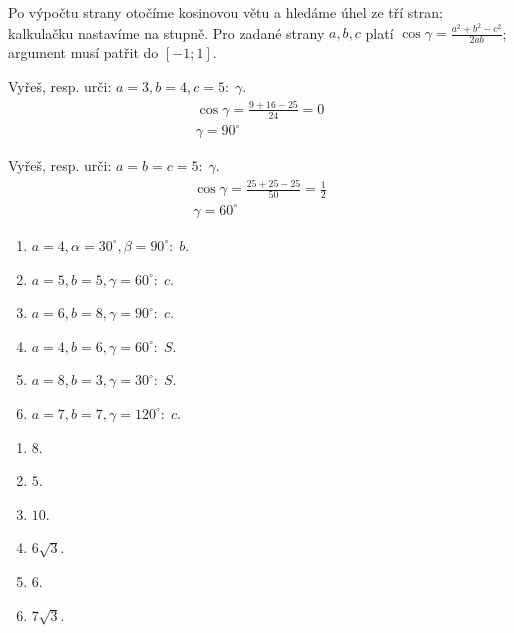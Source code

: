 \documentclass[11pt,a4paper]{article}
\begin{document}
Po výpočtu strany otočíme kosinovou větu a hledáme úhel ze tří stran; kalkulačku nastavíme na stupně.
Pro zadané strany $a,b,c$ platí $\cos\gamma=\frac{a^2+b^2-c^2}{2ab}$; argument musí patřit do $[-1;1]$.
\begin{prikladReseniBox}[title={Příklad 1}]
Vyřeš, resp. urči: $a=3,b=4,c=5:\;\gamma$.
\tcblower
\[\begin{aligned}\cos\gamma=\frac{9+16-25}{24}=0 \\ \gamma=90^\circ\end{aligned}\]
\end{prikladReseniBox}
\begin{prikladReseniBox}[title={Příklad 2}]
Vyřeš, resp. urči: $a=b=c=5:\;\gamma$.
\tcblower
\[\begin{aligned}\cos\gamma=\frac{25+25-25}{50}=\frac{1}{2} \\ \gamma=60^\circ\end{aligned}\]
\end{prikladReseniBox}
\begin{zadaniReseniBox}[title={Samostatná práce 1}]
\begin{enumerate}[label=\alph*)]
\item $a=4,\alpha=30^\circ,\beta=90^\circ:\;b$.
\item $a=5,b=5,\gamma=60^\circ:\;c$.
\item $a=6,b=8,\gamma=90^\circ:\;c$.
\item $a=4,b=6,\gamma=60^\circ:\;S$.
\item $a=8,b=3,\gamma=30^\circ:\;S$.
\item $a=7,b=7,\gamma=120^\circ:\;c$.
\end{enumerate}
\tcblower
\begin{enumerate}[label=\alph*)]
\item $8$.
\item $5$.
\item $10$.
\item $6\sqrt3$.
\item $6$.
\item $7\sqrt3$.
\end{enumerate}
\end{zadaniReseniBox}
\end{document}
